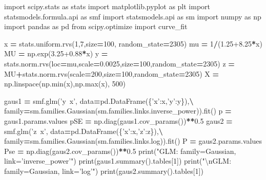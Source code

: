 \documentclass[polish,]{book}
\newenvironment{Shaded}{\begin{snugshade}}{\end{snugshade}}
\newcommand{\BuiltInTok}[1]{#1}
\newcommand{\CharTok}[1]{\textcolor[rgb]{0.31,0.60,0.02}{#1}}
\newcommand{\DecValTok}[1]{\textcolor[rgb]{0.00,0.00,0.81}{#1}}
\newcommand{\FloatTok}[1]{\textcolor[rgb]{0.00,0.00,0.81}{#1}}
\newcommand{\ImportTok}[1]{#1}
\newcommand{\NormalTok}[1]{#1}
\newcommand{\OperatorTok}[1]{\textcolor[rgb]{0.81,0.36,0.00}{\textbf{#1}}}
\newcommand{\StringTok}[1]{\textcolor[rgb]{0.31,0.60,0.02}{#1}}
\begin{document}
\begin{Shaded}
\begin{Highlighting}[]
\ImportTok{import}\NormalTok{ scipy.stats }\ImportTok{as}\NormalTok{ stats}
\ImportTok{import}\NormalTok{ matplotlib.pyplot }\ImportTok{as}\NormalTok{ plt}
\ImportTok{import}\NormalTok{ statsmodels.formula.api }\ImportTok{as}\NormalTok{ smf}
\ImportTok{import}\NormalTok{ statsmodels.api }\ImportTok{as}\NormalTok{ sm}
\ImportTok{import}\NormalTok{ numpy }\ImportTok{as}\NormalTok{ np}
\ImportTok{import}\NormalTok{ pandas }\ImportTok{as}\NormalTok{ pd}
\ImportTok{from}\NormalTok{ scipy.optimize }\ImportTok{import}\NormalTok{ curve_fit}

\NormalTok{x }\OperatorTok{=}\NormalTok{ stats.uniform.rvs(}\DecValTok{1}\NormalTok{,}\DecValTok{7}\NormalTok{,size}\OperatorTok{=}\DecValTok{100}\NormalTok{, random_state}\OperatorTok{=}\DecValTok{2305}\NormalTok{)}
\NormalTok{mu }\OperatorTok{=} \DecValTok{1}\OperatorTok{/}\NormalTok{(}\FloatTok{1.25+8.25}\OperatorTok{*}\NormalTok{x)}
\NormalTok{MU }\OperatorTok{=}\NormalTok{ np.exp(}\FloatTok{3.25+0.88}\OperatorTok{*}\NormalTok{x)}
\NormalTok{y }\OperatorTok{=}\NormalTok{ stats.norm.rvs(loc}\OperatorTok{=}\NormalTok{mu,scale}\OperatorTok{=}\FloatTok{0.0025}\NormalTok{,size}\OperatorTok{=}\DecValTok{100}\NormalTok{,random_state}\OperatorTok{=}\DecValTok{2305}\NormalTok{)}
\NormalTok{z }\OperatorTok{=}\NormalTok{ MU}\OperatorTok{+}\NormalTok{stats.norm.rvs(scale}\OperatorTok{=}\DecValTok{200}\NormalTok{,size}\OperatorTok{=}\DecValTok{100}\NormalTok{,random_state}\OperatorTok{=}\DecValTok{2305}\NormalTok{)}
\NormalTok{X }\OperatorTok{=}\NormalTok{ np.linspace(np.}\BuiltInTok{min}\NormalTok{(x),np.}\BuiltInTok{max}\NormalTok{(x), }\DecValTok{500}\NormalTok{)}
  
\NormalTok{gaus1 }\OperatorTok{=}\NormalTok{ smf.glm(}\StringTok{'y~x'}\NormalTok{, data}\OperatorTok{=}\NormalTok{pd.DataFrame(\{}\StringTok{'x'}\NormalTok{:x,}\StringTok{'y'}\NormalTok{:y\}),}\OperatorTok{\textbackslash{}}
\NormalTok{        family}\OperatorTok{=}\NormalTok{sm.families.Gaussian(sm.families.links.inverse_power)).fit()}
\NormalTok{p }\OperatorTok{=}\NormalTok{ gaus1.params.values}
\NormalTok{pSE }\OperatorTok{=}\NormalTok{ np.diag(gaus1.cov_params())}\OperatorTok{**}\FloatTok{0.5}
\NormalTok{gaus2 }\OperatorTok{=}\NormalTok{ smf.glm(}\StringTok{'z~x'}\NormalTok{, data}\OperatorTok{=}\NormalTok{pd.DataFrame(\{}\StringTok{'x'}\NormalTok{:x,}\StringTok{'z'}\NormalTok{:z\}),}\OperatorTok{\textbackslash{}}
\NormalTok{        family}\OperatorTok{=}\NormalTok{sm.families.Gaussian(sm.families.links.log)).fit()}
\NormalTok{P }\OperatorTok{=}\NormalTok{ gaus2.params.values}
\NormalTok{Pse }\OperatorTok{=}\NormalTok{ np.diag(gaus2.cov_params())}\OperatorTok{**}\FloatTok{0.5}
\BuiltInTok{print}\NormalTok{(}\StringTok{"GLM: family=Gaussian, link='inverse_power'"}\NormalTok{)}
\BuiltInTok{print}\NormalTok{(gaus1.summary().tables[}\DecValTok{1}\NormalTok{])}
\BuiltInTok{print}\NormalTok{(}\StringTok{"}\CharTok{\textbackslash{}n}\StringTok{GLM: family=Gaussian, link='log'"}\NormalTok{)}
\BuiltInTok{print}\NormalTok{(gaus2.summary().tables[}\DecValTok{1}\NormalTok{])}


\end{Highlighting}
\end{Shaded}
\end{document}
